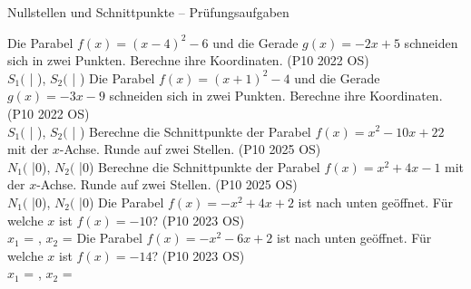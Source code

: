 \begin{aufgabe}{Nullstellen und Schnittpunkte – Prüfungsaufgaben}
\begin{teile}
\steil Die Parabel $f(x) = (x - 4)^2 - 6$ und die Gerade $g(x) = -2x + 5$ schneiden sich in zwei Punkten. Berechne ihre Koordinaten. \hfill (P10 2022 OS) \\ $S_1($ \leerfeld | \leerfeld ), $S_2($ \leerfeld | \leerfeld )
\steil Die Parabel $f(x) = (x + 1)^2 - 4$ und die Gerade $g(x) = -3x - 9$ schneiden sich in zwei Punkten. Berechne ihre Koordinaten. \hfill (P10 2022 OS) \\ $S_1($ \leerfeld | \leerfeld ), $S_2($ \leerfeld | \leerfeld )
\steil Berechne die Schnittpunkte der Parabel $f(x) = x^2 - 10x + 22$ mit der $x$-Achse. Runde auf zwei Stellen. \hfill (P10 2025 OS) \\ $N_1($ \leerfeld |0), $N_2($ \leerfeld |0)
\steil Berechne die Schnittpunkte der Parabel $f(x) = x^2 + 4x - 1$ mit der $x$-Achse. Runde auf zwei Stellen. \hfill (P10 2025 OS) \\ $N_1($ \leerfeld |0), $N_2($ \leerfeld |0)
\steil Die Parabel $f(x) = -x^2 + 4x + 2$ ist nach unten geöffnet. Für welche $x$ ist $f(x) = -10$? \hfill (P10 2023 OS) \\ $x_1$ = \leerfeld , $x_2$ = \leerfeld
\steil Die Parabel $f(x) = -x^2 - 6x + 2$ ist nach unten geöffnet. Für welche $x$ ist $f(x) = -14$? \hfill (P10 2023 OS) \\ $x_1$ = \leerfeld , $x_2$ = \leerfeld
\end{teile}
\end{aufgabe}
